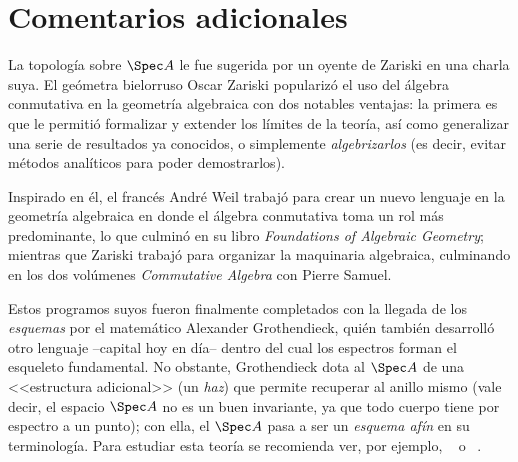 \documentclass[11pt, reqno]{amsart}
\begin{document}
\begin{enumerate}

\end{enumerate}

\appendix
\section{Comentarios adicionales}
La topología sobre $\Spec A$ le fue sugerida por un oyente de Zariski en una charla suya.
El geómetra bielorruso Oscar Zariski popularizó el uso del álgebra conmutativa en la geometría algebraica con dos
notables ventajas: la primera es que le permitió formalizar y extender los límites de la teoría, así como generalizar
una serie de resultados ya conocidos, o simplemente \emph{algebrizarlos} (es decir, evitar métodos analíticos para poder
demostrarlos).

Inspirado en él, el francés André Weil trabajó para crear un nuevo lenguaje en la geometría algebraica en donde el
álgebra conmutativa toma un rol más predominante, lo que culminó en su libro \emph{Foundations of Algebraic Geometry};
mientras que Zariski trabajó para organizar la maquinaria algebraica, culminando en los dos volúmenes \emph{Commutative
Algebra} con Pierre Samuel.

Estos programos suyos fueron finalmente completados con la llegada de los \emph{esquemas} por el matemático Alexander
Grothendieck, quién también desarrolló otro lenguaje --capital hoy en día-- dentro del cual los espectros forman el
esqueleto fundamental.
No obstante, Grothendieck dota al $\Spec A$ de una <<estructura adicional>> (un \emph{haz}) que permite recuperar al
anillo mismo (vale decir, el espacio $\Spec A$ no es un buen invariante, ya que todo cuerpo tiene por espectro a un
punto); con ella, el $\Spec A$ pasa a ser un \emph{esquema afín} en su terminología.
Para estudiar esta teoría se recomienda ver, por ejemplo, \citeauthor{hartshorne:algebraic}~\cite{hartshorne:algebraic}
o \citeauthor{vakil:rising_sea}~\cite{vakil:rising_sea}.

\printbibliography
\end{document}
